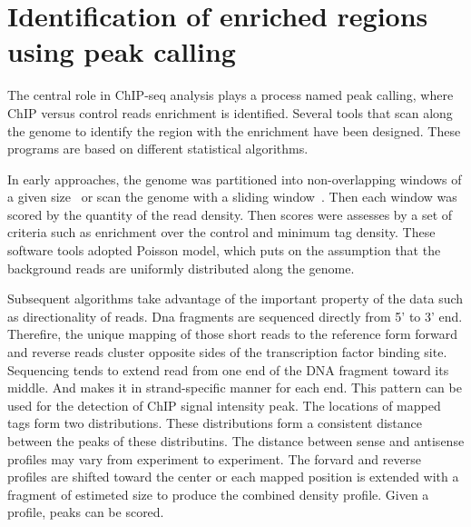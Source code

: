 \chapter{Identification of enriched regions using peak calling}

The central role in ChIP-seq analysis plays a process named peak calling, where ChIP versus control reads enrichment is identified.
Several tools that scan along the genome to identify the region with the enrichment have been designed.
These programs are based on different statistical algorithms.

In early approaches, the genome was partitioned into non-overlapping  windows of a given size~\cite{Zang-2009} or scan the genome with a sliding window~\cite{Xu-2010}.
Then each window was scored by the quantity of the read density. 
Then scores were assesses by a set of criteria such as enrichment over the control and minimum tag density.
These software tools adopted Poisson model, which puts on the assumption that the background reads are uniformly distributed along the genome.


Subsequent algorithms take advantage of the important property of the data such as directionality of reads.
Dna fragments are sequenced directly from 5' to 3' end.
Therefire, the unique mapping of those short reads to the reference form forward and reverse reads cluster opposite sides of the transcription factor binding site.
Sequencing tends to extend read from one end of the DNA fragment toward its middle.
And makes it in strand-specific manner for each end. 
This pattern can be used for the detection of ChIP signal intensity peak.
The locations of mapped tags form two distributions.
These distributions form a consistent distance between the peaks of these distributins.
The distance between sense and antisense profiles may vary from experiment to experiment.
The forvard and reverse profiles are shifted toward the center or each mapped position is extended with a fragment of estimeted size to produce the combined density profile.
Given a profile, peaks can be scored.


